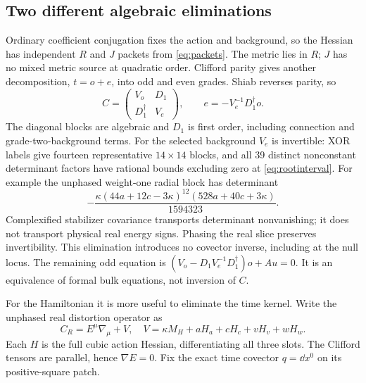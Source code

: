 \subsection{Two different algebraic eliminations}
Ordinary coefficient conjugation fixes the action and background, so the
Hessian has independent $R$ and $J$ packets from \eqref{eq:packets}.
The metric lies in $R$; $J$ has no mixed metric source at quadratic order.
Clifford parity gives another decomposition, $t=o+e$, into odd and even
grades. Shiab reverses parity, so
\begin{equation}
 C=\begin{pmatrix}V_o&D_1\\D_1^\dagger&V_e\end{pmatrix},
 \qquad
 e=-V_e^{-1}D_1^\dagger o.\label{eq:even}
\end{equation}
The diagonal blocks are algebraic and $D_1$ is first order, including
connection and grade-two-background terms. For the selected background
$V_e$ is invertible: XOR labels give fourteen representative
$14\times14$ blocks, and all 39 distinct nonconstant determinant factors
have rational bounds excluding zero at \eqref{eq:rootinterval}.
For example the unphased weight-one radial block has determinant
\begin{equation}
 -\frac{\kappa(44a+12c-3\kappa)^{12}(528a+40c+3\kappa)}{1594323}.
 \label{eq:even-det}
\end{equation}
Complexified stabilizer covariance transports determinant nonvanishing;
it does not transport physical real energy signs. Phasing the real slice
preserves invertibility. This elimination introduces no covector
inverse, including at the null locus. The remaining odd equation is
$(V_o-D_1V_e^{-1}D_1^\dagger)o+Au=0$.
It is an equivalence of formal bulk equations, not inversion of $C$.

For the Hamiltonian it is more useful to eliminate the time kernel.
Write the unphased real distortion operator as
\begin{equation}
 C_R=E^\mu\nabla_\mu+V,
 \quad V=\kappa M_H+aH_a+cH_c+vH_v+wH_w.\label{eq:V}
\end{equation}
Each $H$ is the full cubic action Hessian, differentiating all three
slots. The Clifford tensors are parallel, hence $\nabla E=0$.
Fix the exact time covector $q=\dd x^0$ on its positive-square patch.

